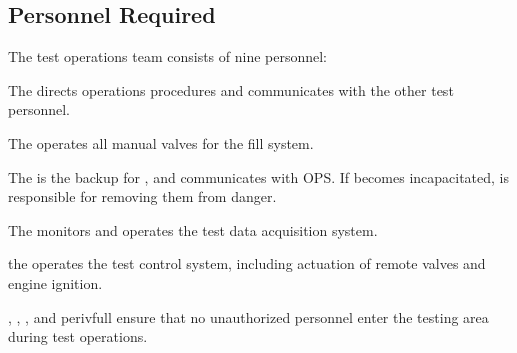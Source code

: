 \subsection{Personnel Required}
The test operations team consists of nine personnel:
\begin{checklist}
    \item The \opsfull{} directs operations procedures and communicates with the other test personnel.
    \item The \primaryfull{} operates all manual valves for the fill system.
    \item The \secondaryfull{} is the backup for \primary{}, and communicates with OPS. If \primary{} becomes incapacitated, \secondary{} is responsible for removing them from danger.
    \item The \daqfull{} monitors and operates the test data acquisition system.
    \item the \controlfull{} operates the test control system, including actuation of remote valves and engine ignition.
    \item \perifull{}, \periifull{}, \periiifull{}, and perivfull{} ensure that no unauthorized personnel enter the testing area during test operations.
\end{checklist}
\setcounter{checklistnum}{0}

